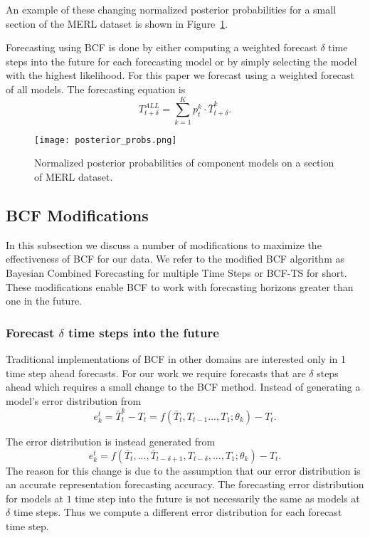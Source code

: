 An example of these changing normalized posterior probabilities for a small section of the MERL dataset is shown in Figure~\ref{fig:probsmerl}.

Forecasting using BCF is done by either computing a weighted forecast $\delta$ time steps into the future for each forecasting model or by simply selecting the model with the highest likelihood.  For this paper we forecast using a weighted forecast of all models.  The forecasting equation is
\begin{equation}
T_{t + \delta}^{ALL} = \sum_{k=1}^{K}p_{t}^{k} \cdot \bar{T}_{t + \delta}^{k}.
\end{equation}

\begin{figure}
\centering
\texttt{[image: posterior\_probs.png]}
\caption{Normalized posterior probabilities of component models on a section of MERL dataset.}
\label{fig:probsmerl}
\end{figure}

\subsection{BCF Modifications}
In this subsection we discuss a number of modifications to maximize the effectiveness of BCF for our data.  We refer to the modified BCF algorithm as Bayesian Combined Forecasting for multiple Time Steps or BCF-TS for short.  These modifications  enable BCF to work with forecasting horizons greater than one in the future.

\subsubsection{Forecast $\delta$ time steps into the future}
Traditional implementations of BCF in other domains \cite{Petridis2001, Zheng2006} are interested only in 1 time step ahead forecasts.  For our work we require forecasts that are $\delta$ steps ahead which requires a small change to the BCF method.  Instead of generating a model's error distribution from 
\begin{equation}
e^{t}_{k} = \bar{T}_{t}^{k} - T_{t} = f(\bar{T}_{t},T_{t - 1} ..., T_{1}; \theta_{k}) - T_{t}.
\end{equation}

The error distribution is instead generated from 
\begin{equation}
e^{t}_{k} = f(\bar{T}_{t}, ..., \bar{T}_{t - \delta + 1}, T_{t - \delta}, ..., T_{1};\theta_{k}) - T_{t}.
\end{equation}
The reason for this change is due to the assumption that our error distribution is an accurate representation forecasting accuracy.  
The forecasting error distribution for models at $1$ time step into the future is not necessarily the same as models at $\delta$ time steps.  Thus we compute a different error distribution for each forecast time step.


